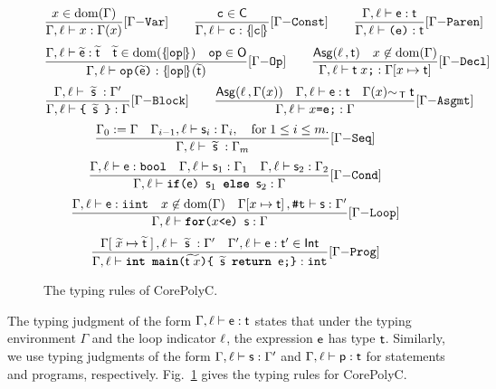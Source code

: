 \documentclass[runningheads]{llncs}
\begin{document}
\begin{figure}[t]
    \centering
    \[
    \trule{x\in\dom(\Gamma)}{\typing{\Gamma}{\l}{x}{\Gamma(x)}}{Var}\qquad
    \trule{\c\in\C}{\typing{\Gamma}{\l}{\c}{\tmap{\c}{}}}{Const}\qquad
    \trule{\typing{\Gamma}{\l}{\e}{\tt}}{\typing{\Gamma}{\l}{\texttt{(e)}}{\tt}}{Paren}\]
    \[
    \trule{\typing{\Gamma}{\l}{\widetilde{\e}}{\widetilde{\tt}}\quad \widetilde{\tt}\in\dom(\tmap{\mathtt{op}}{})\quad \mathtt{op}\in\O}{\typing{\Gamma}{\l}{\texttt{op($\widetilde{\e}$)}}{\tmap{\mathtt{op}}{}(\widetilde{\tt})}}{Op}
    \qquad
    \trule{\assignable(\l\,,\tt)\quad x\not\in\dom(\Gamma)}{\typing{\Gamma}{\l}{\tt\;x\texttt{;}}{\Gamma[x\mapsto \tt]}}{Decl}
    \]
    \[
    \trule
    {\typing{\Gamma}{\l}{\;\widetilde{\s}\;}{\Gamma'}}
    {\typing{\Gamma}{\l}{\texttt{\{ }\widetilde{\s}\texttt{ \}}}{\Gamma}}
    {Block}
    \qquad
    \trule
    {\typing{\assignable(\l\,,\Gamma(x))\quad\Gamma}{\l}{\e}{\tt}\quad\Gamma(x)\comparable \tt}
    {\typing{\Gamma}{\l}{x\texttt{=e;}}{\Gamma}}
    {Asgmt}\]
    \[
    \trule
    {\Gamma_0:=\Gamma\quad\typing{\Gamma_{i-1}}{\l}{\s_i}{\Gamma_{i}} ,\quad\text{for}\;1\le i\le m.}
    {\typing{\Gamma}{\l}{\;\widetilde{\s}\;}{\Gamma_m}}
    {Seq}
    \]
    \[\trule
    {\typing{\Gamma}{\l}{\e}{\typeBool}\quad \typing{\Gamma}{\l}{\s_1}{\Gamma_1}\quad \typing{\Gamma}{\l}{\s_2}{\Gamma_2}}
    {\typing{\Gamma}{\l}{\texttt{\textbf{if}(}\e\texttt{) } \s_1 \texttt{ \textbf{else} } \s_2}{\Gamma}}
    {Cond}\]
    \[
    \trule
    {\typing{\Gamma}{\l}{\e}{\typeIterInt}\quad x\not\in\dom(\Gamma)\quad\typing{\Gamma[x\mapsto{\tt}]\,}{\t}{\s}{\Gamma'}}
    {\typing{\Gamma}{\l}{\texttt{\textbf{for}(}x \texttt{<} \e \texttt{) } \s}{\Gamma}}
    {Loop}\]
    \[
    \trule
    {\typing{\Gamma[\;\widetilde{x}\mapsto\widetilde{\tt}\;]\,}{\l}{\;\widetilde{\s}\;}{\Gamma'}\quad\typing{\Gamma'}{\l}{\e}{\tt'\in\Int}}
    {\typing{\Gamma}{\l}{\texttt{\textbf{int main}(}\widetilde{\tt\;x}\texttt{)\{ }\widetilde{\s}\texttt{ \textbf{return} }\e\texttt{;\}}}{\typeInt}}
    {Prog}\]
    \caption{The typing rules of CorePolyC.}
    \label{fig:typing}
\end{figure}

The typing judgment of the form $\typing{\Gamma}{\l}{\e}{\tt}$ states that under the typing environment $\Gamma$ and the loop indicator $\l$, the expression $\e$ has type $\tt$.
Similarly, we use typing judgments of the form $\typing{\Gamma}{\l}{\s}{\Gamma'}$ and $\typing{\Gamma}{\l}{\p}{\tt}$ for statements and programs, respectively.
Fig.~\ref{fig:typing} gives the typing rules for CorePolyC.
\end{document}
